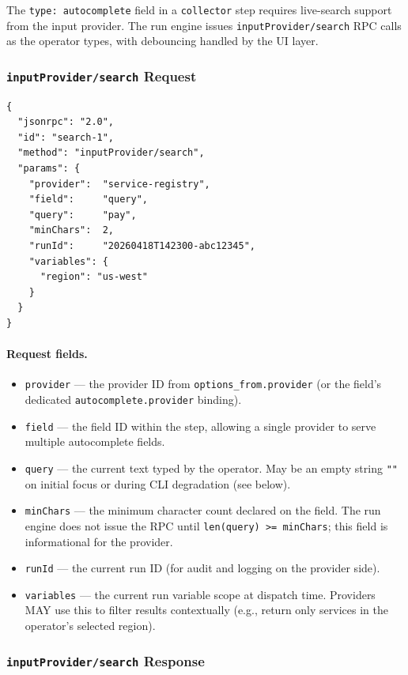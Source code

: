 The \texttt{type: autocomplete} field in a \texttt{collector} step requires live-search
support from the input provider.  The run engine issues \texttt{inputProvider/search}
RPC calls as the operator types, with debouncing handled by the UI layer.

\subsubsection*{\texttt{inputProvider/search} Request}

\begin{verbatim}
{
  "jsonrpc": "2.0",
  "id": "search-1",
  "method": "inputProvider/search",
  "params": {
    "provider":  "service-registry",
    "field":     "query",
    "query":     "pay",
    "minChars":  2,
    "runId":     "20260418T142300-abc12345",
    "variables": {
      "region": "us-west"
    }
  }
}
\end{verbatim}

\paragraph{Request fields.}
\begin{itemize}
  \item \texttt{provider} — the provider ID from \texttt{options\_from.provider} (or
        the field's dedicated \texttt{autocomplete.provider} binding).
  \item \texttt{field} — the field ID within the step, allowing a single provider to
        serve multiple autocomplete fields.
  \item \texttt{query} — the current text typed by the operator.  May be an empty
        string \texttt{""} on initial focus or during CLI degradation (see below).
  \item \texttt{minChars} — the minimum character count declared on the field.  The
        run engine does not issue the RPC until \texttt{len(query) >= minChars}; this
        field is informational for the provider.
  \item \texttt{runId} — the current run ID (for audit and logging on the provider side).
  \item \texttt{variables} — the current run variable scope at dispatch time.  Providers
        MAY use this to filter results contextually (e.g., return only services in the
        operator's selected region).
\end{itemize}

\subsubsection*{\texttt{inputProvider/search} Response}

